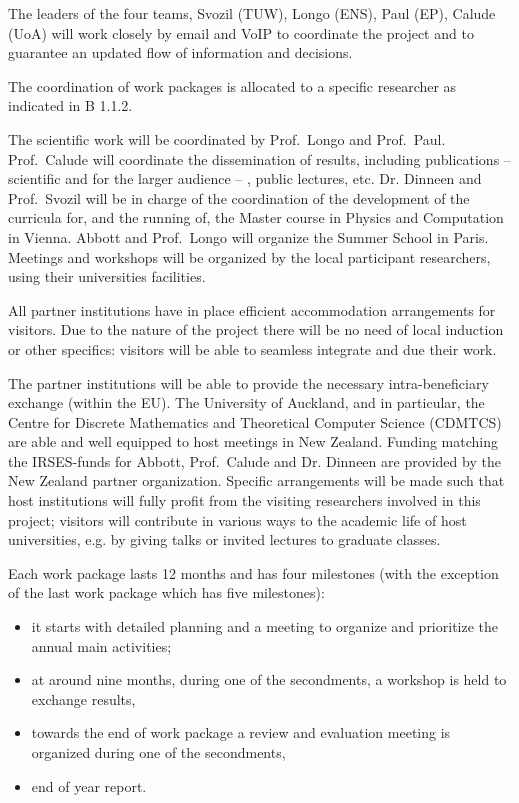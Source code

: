 \documentclass[12pt]{article}
\begin{document}
The leaders of the four teams, Svozil (TUW), Longo (ENS), Paul (EP), Calude (UoA) will work closely by email and VoIP to coordinate the project and to guarantee an updated  flow  of information and decisions.

The coordination of work packages is allocated to a specific researcher as indicated in B 1.1.2.

The scientific work will be coordinated by Prof.\  Longo and Prof.\  Paul. Prof.\  Calude will coordinate
the dissemination of results, including publications -- scientific and for the larger audience -- , public lectures, etc. Dr.  Dinneen and Prof.\ Svozil will be in  charge of the coordination of the development of the curricula for,
and the running of,  the Master course in Physics and Computation in Vienna.  Abbott and Prof.\  Longo will organize the Summer
School in Paris. Meetings and workshops will be organized by the local participant researchers, using their universities facilities.

All partner institutions have in place efficient accommodation arrangements for visitors.  Due to the nature of the project there will be no need of local induction or other specifics: visitors will be able to
seamless integrate and due their work.

 The partner institutions will be able to provide the necessary intra-beneficiary exchange (within the EU). The University of Auckland, and in particular, the Centre for Discrete Mathematics and Theoretical Computer Science (CDMTCS) are able and well equipped to host meetings in New Zealand. Funding matching the IRSES-funds for  Abbott, Prof.\ Calude and Dr. Dinneen are provided by the New Zealand partner organization. Specific arrangements will be made such that host institutions will fully profit from the visiting researchers involved in this project;   visitors will contribute in various ways to the academic life of host universities, e.g. by giving talks or invited lectures to graduate classes.

 Each work package lasts 12 months and has four milestones (with the exception of the last work package which has five milestones):

 \begin{itemize}
 \item it starts with detailed planning and a meeting to organize and prioritize the annual main activities;
 \item at around nine months, during one of the secondments, a workshop is held to exchange results,
 \item towards the end of work package a review and evaluation meeting is organized during one of the secondments,
 \item end of year report.
 \end{itemize}
\end{document}
